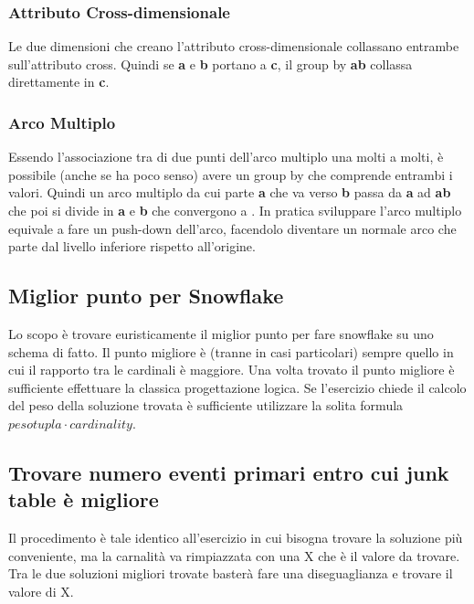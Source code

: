 \subsubsection{Attributo Cross-dimensionale}
Le due dimensioni che creano l'attributo cross-dimensionale collassano entrambe sull'attributo cross. Quindi  se \textbf{a} e \textbf{b} portano a  \textbf{c}, il group by {\textbf{ab}} collassa direttamente in {\textbf{c}}.
\subsubsection{Arco Multiplo}
Essendo l'associazione tra di due punti dell'arco multiplo una molti a molti, è possibile (anche se ha poco senso) avere un group by che comprende entrambi i valori. Quindi un arco multiplo da cui parte \textbf{a} che va verso \textbf{b} passa da \textbf{a} ad \textbf{ab}  che poi si divide in \textbf{a} e \textbf{b} che convergono a {}. In pratica sviluppare l'arco multiplo equivale a fare un push-down dell'arco, facendolo diventare un normale arco che parte dal livello inferiore rispetto all'origine.
\subsection{Miglior punto per Snowflake}
Lo scopo è trovare euristicamente il miglior punto per fare snowflake su uno schema di fatto. Il punto migliore è (tranne in casi particolari) sempre quello in cui il rapporto tra le cardinali è maggiore. Una volta trovato il punto migliore è sufficiente effettuare la classica progettazione logica. Se l’esercizio chiede il calcolo del peso della soluzione trovata è sufficiente utilizzare la solita formula $pesotupla \cdot cardinality$.
\subsection{Trovare numero eventi primari entro cui junk table è migliore}
Il procedimento è tale identico all’esercizio in cui bisogna trovare la soluzione più conveniente, ma la carnalità va rimpiazzata con una X che è il valore da trovare. Tra le due soluzioni migliori trovate basterà fare una diseguaglianza e trovare il valore di X.
